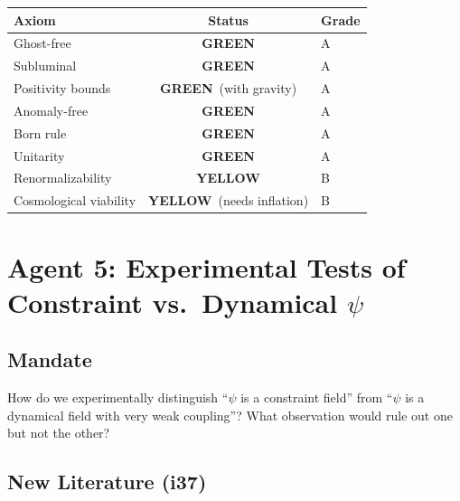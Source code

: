 \documentclass[11pt,a4paper]{article}
\newcommand{\GREEN}{\textcolor{dfdgreen}{\textbf{GREEN}}}
\newcommand{\YELLOW}{\textcolor{dfdyellow}{\textbf{YELLOW}}}
\begin{document}
\begin{center}
\begin{tabular}{lcl}
\toprule
\textbf{Axiom} & \textbf{Status} & \textbf{Grade} \\
\midrule
Ghost-free & \GREEN & A \\
Subluminal & \GREEN & A \\
Positivity bounds & \GREEN\ (with gravity) & A \\
Anomaly-free & \GREEN & A \\
Born rule & \GREEN & A \\
Unitarity & \GREEN & A \\
Renormalizability & \YELLOW & B \\
Cosmological viability & \YELLOW\ (needs inflation) & B \\
\bottomrule
\end{tabular}
\end{center}

\newpage
\section{Agent 5: Experimental Tests of Constraint vs.\ Dynamical $\psi$}
\label{sec:agent5}

\subsection{Mandate}

How do we experimentally distinguish ``$\psi$ is a constraint field'' from ``$\psi$ is a dynamical field with very weak coupling''? What observation would rule out one but not the other?

\subsection{New Literature (i37)}
\end{document}
